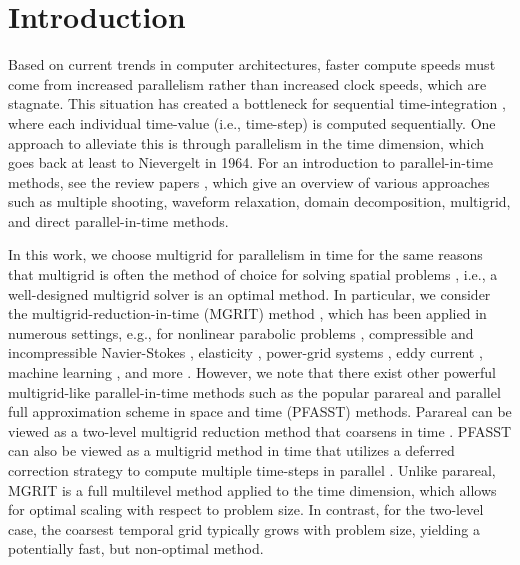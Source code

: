 \documentclass[VANCOUVER,STIX1COL]{WileyNJD-v2}
\makeatletter
\newcommand{\bs}[1]{\textcolor{magenta}{[BS\@: #1]}}
\newcommand{\JS}[1]{\textcolor{blue}{[JS\@: #1]}}
\makeatother
\begin{document}
\maketitle

\section{Introduction}
\label{sec:intro}


Based on current trends in computer architectures, faster compute speeds must come from increased parallelism rather than
increased clock speeds, which are stagnate. This situation has created a bottleneck for sequential time-integration \cite{Ga2015, Fa2014, OnSc2019}, where each individual time-value (i.e., time-step) is computed sequentially. 
One approach to alleviate this is through parallelism in the time dimension, which goes back at least to Nievergelt \cite{Ni1964} in 1964.
For an introduction to parallel-in-time methods, see the review papers \cite{Ga2015, OnSc2019}, which
give an overview of various approaches such as multiple shooting, waveform relaxation, domain decomposition, multigrid, and direct parallel-in-time methods.

In this work, we choose multigrid for parallelism in time for the same reasons that multigrid is often
the method of choice for solving spatial problems \cite{TrOo2001,BrHeMc2000}, i.e., a well-designed 
multigrid solver is an optimal
method.  In particular, we consider the multigrid-reduction-in-time (MGRIT) method \cite{Fa2014}, 
which has been applied in numerous settings, e.g., for nonlinear parabolic problems \cite{Fa2016},
compressible and incompressible Navier-Stokes \cite{FalKatz2014,ChrGaGuFaSc2019b}, elasticity \cite{HeNoRoSc2017}, power-grid systems \cite{LeFaWoTo2016,GuFaToWoSc2020}, eddy current \cite{FrHaKuSc2018,BoFrHaSc2020},
machine learning \cite{GuRuScCyGa2018,CyGuSc2019}, and more \cite{OnSc2019}.
However, we note that there exist other powerful multigrid-like parallel-in-time methods such as the popular parareal 
\cite{LiMaTu2001} and parallel full approximation scheme in space and time (PFASST) 
\cite{MiWi2008,EmMi2012,Mi2010} methods. Parareal can be viewed as a two-level multigrid reduction 
method that coarsens in time \cite{gander2007analysis}. PFASST can also be viewed as a multigrid 
method in time that utilizes a deferred correction strategy to compute multiple time-steps in parallel 
\cite{bolten2017multigrid}.   Unlike parareal, MGRIT is a full multilevel method applied to the 
time dimension, which allows for
optimal scaling with respect to problem size.  In contrast, for the two-level case, the coarsest temporal grid typically
grows with problem size, yielding a potentially fast, but non-optimal method.
\end{document}
